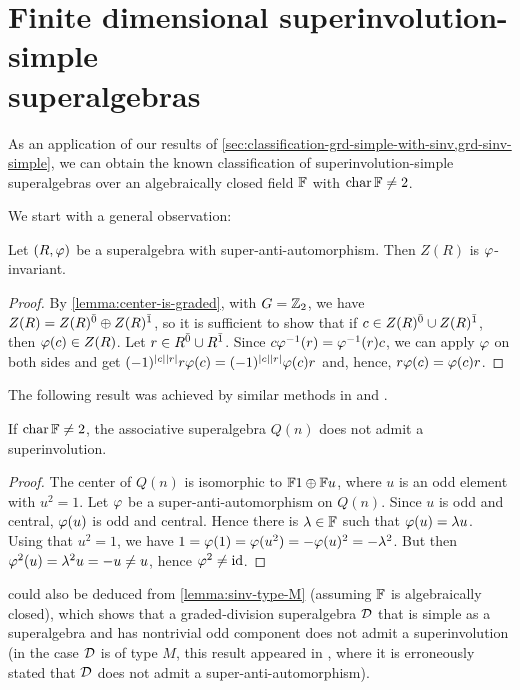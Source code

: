 
\section[Finite dimensional superinvolution-simple superalgebras]{Finite dimensional superinvolution-simple \\ superalgebras}\label{sec:sinv-simple}

As an application of our results of \cref{sec:classification-grd-simple-with-sinv,grd-sinv-simple}, we can obtain the known classification of superinvolution-simple superalgebras over an algebraically closed field $\mathbb{F}$ with $\operatorname{char} \mathbb{F} \neq 2$. 

We start with a general observation: 

\begin{lemma}
	Let $(R, \varphi)$ be a superalgebra with super-anti-automorphism.
	Then $Z(R)$ is $\varphi$-invariant.
\end{lemma}

\begin{proof}
	By \cref{lemma:center-is-graded}, with $G = \mathbb{Z}_2$, we have $Z(R) = Z(R)^{\bar0} \oplus Z(R)^{\bar1}$, so it is sufficient to show that if $c \in Z(R)^{\bar0} \cup Z(R)^{\bar1}$, then $\varphi(c) \in Z(R)$. 
	Let $r \in R^{\bar0} \cup R^{\bar1}$.
	Since $c\varphi^{-1} (r) = \varphi^{-1} (r)c$, we can apply $\varphi$ on both sides and get $(-1)^{|c||r|} r \varphi(c) = (-1)^{|c||r|} \varphi(c) r$ and, hence, $r \varphi(c) = \varphi(c) r$.
\end{proof}

The following result was achieved by similar methods in \cite[Theorem 8.1]{Sh98} and \cite[Theorem 28]{MR2407903}. 

\begin{cor}\label{cor:Q-no-sinv-center}
	If $\operatorname{char} \mathbb{F} \neq 2$, the associative superalgebra $Q(n)$ does not admit a superinvolution.
\end{cor}

\begin{proof}
	The center of $Q(n)$ is isomorphic to $\mathbb{F}1 \oplus \mathbb{F} u$, where $u$ is an odd element with $u^2 = 1$.
	Let $\varphi$ be a super-anti-automorphism on $Q(n)$.
	Since $u$ is odd and central, $\varphi(u)$ is odd and central.
	Hence there is $\lambda \in \mathbb{F}$ such that $\varphi(u) = \lambda u$.
	Using that $u^2 = 1$, we have $1 = \varphi(1) = \varphi(u^2) = - \varphi(u)^2 = - \lambda^2$.
	But then $\varphi^2 (u) = \lambda^2 u = -u \neq u$, hence $\varphi^2 \neq \operatorname{id}$.
\end{proof}

\begin{remark}
     could also be deduced from \cref{lemma:sinv-type-M} (assuming $\mathbb{F}$ is algebraically closed), which shows that a graded-division superalgebra $\mathcal{D}$ that is simple as a superalgebra and has nontrivial odd component does not admit a superinvolution (in the case $\mathcal{D}$ is of type $M$, this result appeared in \cite[Theorem 3]{BTT}, where it is erroneously stated that $\mathcal{D}$ does not admit a super-anti-automorphism). 
\end{remark}


